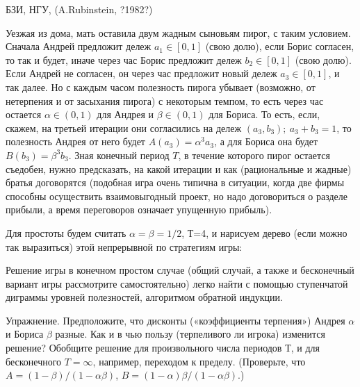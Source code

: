 \begin{problem}
\begin{source}
БЗИ, НГУ, (A.Rubinstein,   {?1982?})
\end{source}

Уезжая из дома, мать оставила двум жадным сыновьям пирог, с
таким условием. Сначала Андрей предложит дележ $a_1\in
[0,1]$ (свою долю), если Борис согласен, то так и будет,
иначе через час Борис предложит дележ $b_2\in [0,1]$ (свою
долю). Если Андрей не согласен, он через час предложит
новый дележ $a_3\in [0,1]$, и так далее. Но с каждым часом
полезность пирога убывает (возможно, от нетерпения и от
засыхания пирога) с некоторым темпом, то есть через час
остается $\alpha\in (0,1)$ для Андрея и $\beta\in (0,1)$
для Бориса. То есть, если, скажем, на третьей итерации они
согласились на дележ $(a_3, b_3); ~ a_3+ b_3=1$, то
полезность Андрея от него будет $A(a_3)=\alpha^3 a_3$, а для
Бориса она будет $B(b_3)=\beta^3 b_3$. Зная конечный период $T$, в течение
которого пирог остается съедобен, нужно предсказать, на
какой итерации и как (рациональные и жадные) братья
договорятся (подобная игра очень типична в ситуации, когда
две фирмы способны осуществить взаимовыгодный проект, но
надо договориться о разделе прибыли, а время переговоров
означает упущенную прибыль).

Для простоты будем считать $\alpha = \beta =1/2$, Т=4, и
нарисуем дерево (если можно так выразиться) этой
непрерывной по стратегиям игры:

Решение игры в конечном простом случае (общий случай, а также и
бесконечный вариант игры рассмотрите самостоятельно) легко
найти с помощью ступенчатой диграммы уровней полезностей,
алгоритмом обратной индукции.

Упражнение. Предположите, что дисконты («коэффициенты
терпения») Андрея $\alpha$ и Бориса $\beta$ разные. Как и в
чью пользу (терпеливого ли игрока) изменится решение? Обобщите
решение для произвольного числа периодов Т, и для
бесконечного $T=\infty$, например, переходом к пределу.
(Проверьте, что $A=(1-\beta)/(1-\alpha\beta)$,
$B=(1-\alpha)\beta/(1-\alpha\beta)$.)



\begin{sol}

\end{sol}
\end{problem}







